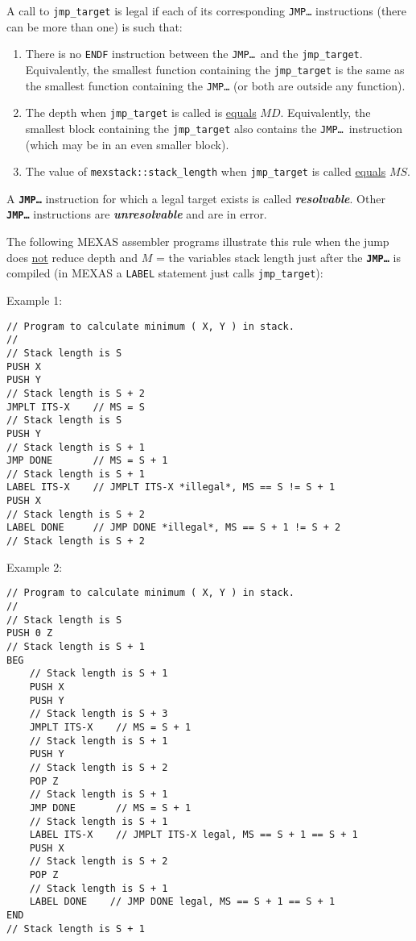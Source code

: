 \documentclass[12pt]{article}
\newcommand{\TT}[1]{{\tt \bfseries #1}}
\newcommand{\key}[1]{{\bf \em #1}\index{#1}}
\newenvironment{indpar}[1][0.3in]%
	{\begin{list}{}%
		     {\setlength{\itemsep}{0in}%
		      \setlength{\topsep}{0in}%
		      \setlength{\parsep}{1ex}%
		      \setlength{\labelwidth}{#1}%
		      \setlength{\leftmargin}{#1}%
		      \addtolength{\leftmargin}{\labelsep}}%
	 \item}%
	{\end{list}}
\begin{document}
A call to {\tt jmp\_target} is legal if each of its
corresponding {\tt JMP\ldots} instructions (there can be more than one)
is such that:
\begin{enumerate}
\item
There is no {\tt ENDF} instruction between the
{\tt JMP\ldots}~and the {\tt jmp\_target}.
Equivalently, the smallest function containing the {\tt jmp\_target}
is the same as the smallest function containing the {\tt JMP\ldots}
(or both are outside any function).
\item The depth when {\tt jmp\_target} is called is \underline{equals} $MD$.
Equivalently, the smallest block containing the {\tt jmp\_target}
also contains the {\tt JMP\ldots}~instruction (which may be in an even
smaller block).
\item The value of {\tt mexstack::stack\_length} when {\tt jmp\_target}
is called \underline{equals} $MS$.
\end{enumerate}

A \TT{JMP\ldots} instruction for which a legal target exists
is called \key{resolvable}.  Other \TT{JMP\ldots} instructions
are \key{unresolvable} and are in error.

The following MEXAS assembler programs illustrate this
rule when the jump does \underline{not}
reduce depth and $M$ = the variables stack length just after the
\TT{JMP\ldots} is compiled (in MEXAS a {\tt LABEL} statement
just calls {\tt jmp\_target}):

Example 1:
\begin{indpar}\begin{verbatim}
// Program to calculate minimum ( X, Y ) in stack.
//
// Stack length is S
PUSH X
PUSH Y
// Stack length is S + 2
JMPLT ITS-X    // MS = S
// Stack length is S
PUSH Y
// Stack length is S + 1
JMP DONE       // MS = S + 1
// Stack length is S + 1
LABEL ITS-X    // JMPLT ITS-X *illegal*, MS == S != S + 1
PUSH X
// Stack length is S + 2
LABEL DONE     // JMP DONE *illegal*, MS == S + 1 != S + 2
// Stack length is S + 2
\end{verbatim}\end{indpar}

Example 2:
\begin{indpar}\begin{verbatim}
// Program to calculate minimum ( X, Y ) in stack.
//
// Stack length is S
PUSH 0 Z
// Stack length is S + 1
BEG
    // Stack length is S + 1
    PUSH X
    PUSH Y
    // Stack length is S + 3
    JMPLT ITS-X    // MS = S + 1
    // Stack length is S + 1
    PUSH Y
    // Stack length is S + 2
    POP Z
    // Stack length is S + 1
    JMP DONE       // MS = S + 1
    // Stack length is S + 1
    LABEL ITS-X    // JMPLT ITS-X legal, MS == S + 1 == S + 1
    PUSH X
    // Stack length is S + 2
    POP Z
    // Stack length is S + 1
    LABEL DONE    // JMP DONE legal, MS == S + 1 == S + 1
END
// Stack length is S + 1
\end{verbatim}\end{indpar}
\end{document}
